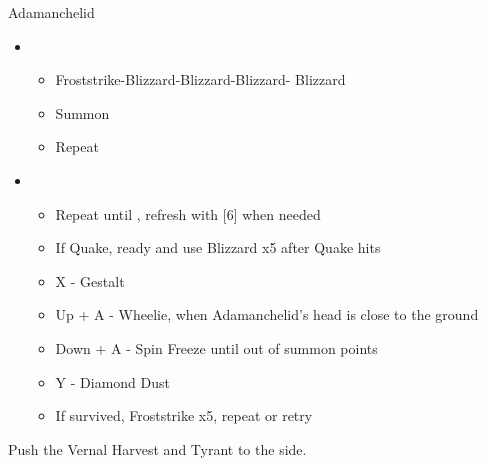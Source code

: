 \begin{multicols}{2}
\begin{menu}
\begin{itemize}
\begin{itemize}
\begin{itemize}
{}%
{\paradigmline{\com}{\sen}{\med}}%
{\paradigmline[2]{\textit{(\rav)}}{\textit{\rav}}{\textit{\rav}}}%
{\paradigmline{\med}{\sen}{\med}}
\end{itemize}
\end{itemize}
\end{itemize}
\end{menu}
\begin{battle}{Adamanchelid}
\begin{itemize}
    \item \sixth
    \begin{itemize}
        \item Froststrike-Blizzard-Blizzard-Blizzard- Blizzard
        \item Summon
        \item Repeat
    \end{itemize}
    \item \fifth
    \begin{itemize}
        \item Repeat until \stagger, refresh with [6] when needed
        \item If Quake, ready and use Blizzard x5 after Quake hits
        \item X - Gestalt
        \item Up + A - Wheelie, when Adamanchelid's head is close to the ground
        \item Down + A - Spin Freeze until out of summon points
        \item Y - Diamond Dust
        \item If survived, Froststrike x5, repeat or retry
    \end{itemize}
\end{itemize}
\end{battle}
Push the Vernal Harvest and Tyrant to the side.


\end{multicols}
